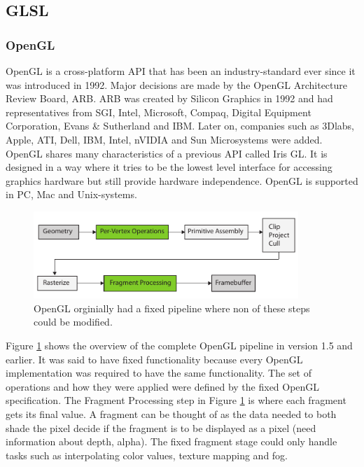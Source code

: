 \subsection{GLSL}

\subsubsection{OpenGL}

OpenGL is a cross-platform API that has been an industry-standard ever since it was introduced in 1992\cite{glredbook}. Major decisions are made by the OpenGL Architecture Review Board, ARB. ARB was created by Silicon Graphics in 1992 and had representatives from SGI, Intel, Microsoft, Compaq, Digital Equipment Corporation, Evans \& Sutherland and IBM. Later on, companies such as 3Dlabs, Apple, ATI, Dell, IBM, Intel, nVIDIA and Sun Microsystems were added. OpenGL shares many characteristics of a previous API called Iris GL. It is designed in a way where it tries to be the lowest level interface for accessing graphics hardware but still provide hardware independence. OpenGL is supported in PC, Mac and Unix-systems.

\begin{figure}[ht!]
\centering
\includegraphics[width=100mm]{img/glpipeline.pdf}
\caption{OpenGL orginially had a fixed pipeline where non of these steps could be modified.}
\label{glfixed}
\end{figure}

Figure \ref{glfixed} shows the overview of the complete OpenGL pipeline in version 1.5 and earlier. It was said to have fixed functionality because every OpenGL implementation was required to have the same functionality. The set of operations and how they were applied were defined by the fixed OpenGL specification. The Fragment Processing step in Figure \ref{glfixed} is where each fragment gets its final value. A fragment can be thought of as the data needed to both shade the pixel decide if the fragment is to be displayed as a pixel (need information about depth, alpha). The fixed fragment stage could only handle tasks such as interpolating color values, texture mapping and fog. 


